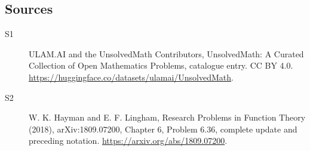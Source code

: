 \documentclass[11pt]{article}
\begin{document}
\subsection{Sources}
\begin{description}
\item[\hypertarget{source:statement:1}{S1}] ULAM.AI and the UnsolvedMath Contributors, UnsolvedMath: A Curated Collection of Open Mathematics Problems, catalogue entry. CC BY 4.0. \url{https://huggingface.co/datasets/ulamai/UnsolvedMath}.
\item[\hypertarget{source:statement:2}{S2}] W. K. Hayman and E. F. Lingham, Research Problems in Function Theory (2018), arXiv:1809.07200, Chapter 6, Problem 6.36, complete update and preceding notation. \url{https://arxiv.org/abs/1809.07200}.
\end{description}
\label{end:statement}
\end{document}
